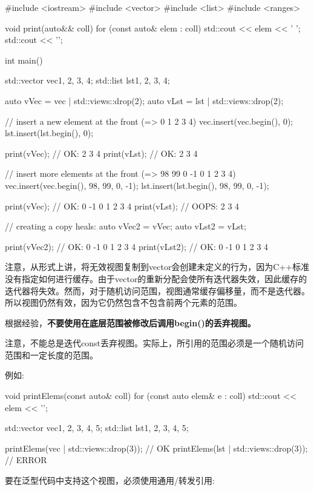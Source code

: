 \begin{cpp}
#include <iostream>
#include <vector>
#include <list>
#include <ranges>

void print(auto&& coll)
{
	for (const auto& elem : coll) {
		std::cout << elem << ' ';
	}
	std::cout << '\n';
}

int main()
{
	std::vector vec{1, 2, 3, 4};
	std::list lst{1, 2, 3, 4};
	
	auto vVec = vec | std::views::drop(2);
	auto vLst = lst | std::views::drop(2);
	
	// insert a new element at the front (=> 0 1 2 3 4)
	vec.insert(vec.begin(), 0);
	lst.insert(lst.begin(), 0);
	
	print(vVec); // OK: 2 3 4
	print(vLst); // OK: 2 3 4
	
	// insert more elements at the front (=> 98 99 0 -1 0 1 2 3 4)
	vec.insert(vec.begin(), {98, 99, 0, -1});
	lst.insert(lst.begin(), {98, 99, 0, -1});
	
	print(vVec); // OK: 0 -1 0 1 2 3 4
	print(vLst); // OOPS: 2 3 4
	
	// creating a copy heals:
	auto vVec2 = vVec;
	auto vLst2 = vLst;
	
	print(vVec2); // OK: 0 -1 0 1 2 3 4
	print(vLst2); // OK: 0 -1 0 1 2 3 4
}
\end{cpp}

注意，从形式上讲，将无效视图复制到vector会创建未定义的行为，因为C++标准没有指定如何进行缓存。由于vector的重新分配会使所有迭代器失效，因此缓存的迭代器将失效。然而，对于随机访问范围，视图通常缓存偏移量，而不是迭代器。所以视图仍然有效，因为它仍然包含不包含前两个元素的范围。

根据经验，\textbf{不要使用在底层范围被修改后调用begin()的丢弃视图。}


注意，不能总是迭代const丢弃视图。实际上，所引用的范围必须是一个随机访问范围和一定长度的范围。

例如:

\begin{cpp}
void printElems(const auto& coll) {
	for (const auto elem& e : coll) {
		std::cout << elem << '\n';
	}
}

std::vector vec{1, 2, 3, 4, 5};
std::list lst{1, 2, 3, 4, 5};

printElems(vec | std::views::drop(3)); // OK
printElems(lst | std::views::drop(3)); // ERROR
\end{cpp}

要在泛型代码中支持这个视图，必须使用通用/转发引用:


